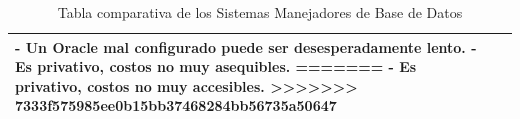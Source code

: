 \begin{table}[H]
\begin{center}
\begin{tabular}{ | m{3cm} | m{4.5cm}| m{4.5cm}| }
 - Un Oracle mal configurado puede ser desesperadamente lento.
  \newline
  - Es privativo, costos no muy asequibles.
=======
 - Es privativo, costos no muy accesibles.
  \newline
>>>>>>> 7333f575985ee0b15bb37468284bb56735a50647
 \\
 \hline
 \end{tabular}
\caption{Tabla comparativa de los Sistemas Manejadores de Base de Datos}
\label{Tabla:3}
\end{center}
\end{table}	

\newpage









